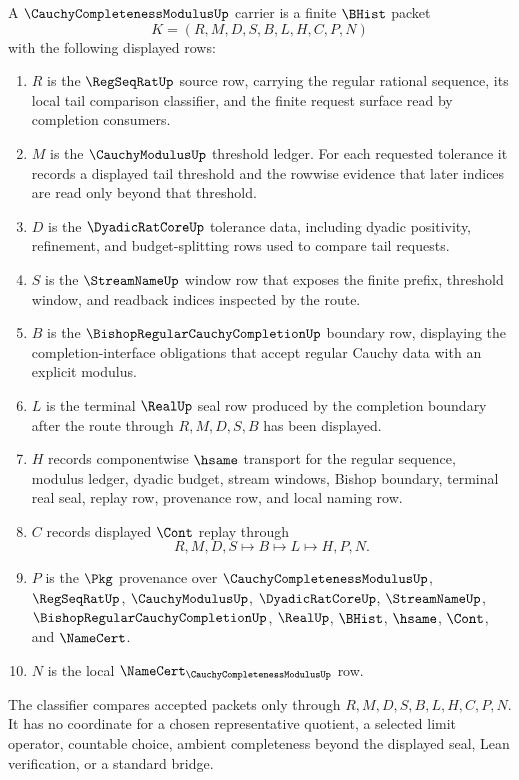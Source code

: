 \begin{definition}
\label{def:cauchy-completeness-modulus-carrier}
A $\CauchyCompletenessModulusUp$ carrier is a finite $\BHist$ packet
$$
K=(R,M,D,S,B,L,H,C,P,N)
$$
with the following displayed rows:
\begin{enumerate}
\item $R$ is the $\RegSeqRatUp$ source row, carrying the regular rational sequence, its local tail comparison classifier, and the finite request surface read by completion consumers.
\item $M$ is the $\CauchyModulusUp$ threshold ledger. For each requested tolerance it records a displayed tail threshold and the rowwise evidence that later indices are read only beyond that threshold.
\item $D$ is the $\DyadicRatCoreUp$ tolerance data, including dyadic positivity, refinement, and budget-splitting rows used to compare tail requests.
\item $S$ is the $\StreamNameUp$ window row that exposes the finite prefix, threshold window, and readback indices inspected by the route.
\item $B$ is the $\BishopRegularCauchyCompletionUp$ boundary row, displaying the completion-interface obligations that accept regular Cauchy data with an explicit modulus.
\item $L$ is the terminal $\RealUp$ seal row produced by the completion boundary after the route through $R,M,D,S,B$ has been displayed.
\item $H$ records componentwise $\hsame$ transport for the regular sequence, modulus ledger, dyadic budget, stream windows, Bishop boundary, terminal real seal, replay row, provenance row, and local naming row.
\item $C$ records displayed $\Cont$ replay through
$$
R,M,D,S \longmapsto B \longmapsto L \longmapsto H,P,N .
$$
\item $P$ is the $\Pkg$ provenance over $\CauchyCompletenessModulusUp$, $\RegSeqRatUp$, $\CauchyModulusUp$, $\DyadicRatCoreUp$, $\StreamNameUp$, $\BishopRegularCauchyCompletionUp$, $\RealUp$, $\BHist$, $\hsame$, $\Cont$, and $\NameCert$.
\item $N$ is the local $\NameCert_{\CauchyCompletenessModulusUp}$ row.
\end{enumerate}
The classifier compares accepted packets only through $R,M,D,S,B,L,H,C,P,N$. It has no coordinate for a chosen representative quotient, a selected limit operator, countable choice, ambient completeness beyond the displayed seal, Lean verification, or a standard bridge.
\end{definition}

